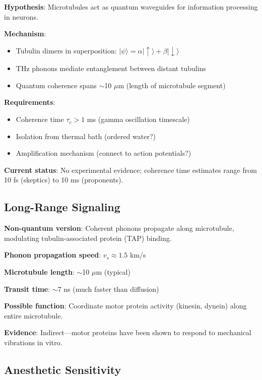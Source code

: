 \textbf{Hypothesis}: Microtubules act as quantum waveguides for
information processing in neurons.

\textbf{Mechanism}:
\begin{itemize}
\item Tubulin dimers in superposition: $|\psi\rangle = \alpha|\uparrow\rangle + \beta|\downarrow\rangle$
\item THz phonons mediate entanglement between distant tubulins
\item Quantum coherence spans $\sim$10 $\mu$m (length of microtubule segment)
\end{itemize}

\textbf{Requirements}:
\begin{itemize}
\item Coherence time $\tau_c > 1$ ms (gamma oscillation timescale)
\item Isolation from thermal bath (ordered water?)
\item Amplification mechanism (connect to action potentials?)
\end{itemize}

\textbf{Current status}: No experimental evidence; coherence time estimates range from 10 fs (skeptics) to 10 ms (proponents).

\subsection{Long-Range Signaling}\label{long-range-signaling}

\textbf{Non-quantum version}: Coherent phonons propagate along microtubule, modulating tubulin-associated protein (TAP) binding.

\textbf{Phonon propagation speed}: $v_s \approx 1.5$ km/s

\textbf{Microtubule length}: $\sim$10 $\mu$m (typical)

\textbf{Transit time}: $\sim$7 ns (much faster than diffusion)

\textbf{Possible function}: Coordinate motor protein activity (kinesin,
dynein) along entire microtubule.

\textbf{Evidence}: Indirect---motor proteins have been shown to
respond to mechanical vibrations in vitro.

\subsection{Anesthetic Sensitivity}\label{anesthetic-sensitivity}

